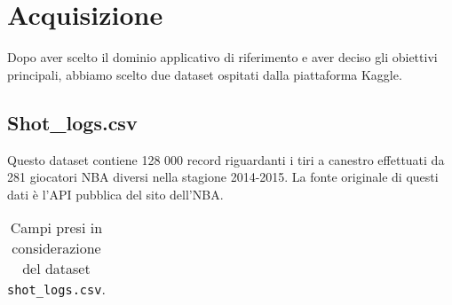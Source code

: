 \section{Acquisizione}

Dopo aver scelto il dominio applicativo di riferimento e aver deciso gli obiettivi principali, abbiamo scelto due dataset ospitati dalla piattaforma Kaggle.

\subsection{Shot\_logs.csv}

Questo dataset contiene 128 000 record riguardanti i tiri a canestro effettuati da 281 giocatori NBA diversi nella stagione 2014-2015. La fonte originale di questi dati è l’API pubblica del sito dell’NBA.
\begin{center}
	\begin{longtable}[m]{|m{8em} m{7em} m{16em}|} 

		\caption{Campi presi in considerazione del dataset \texttt{shot\_logs.csv}.\label{long}}\\


\end{longtable}
\end{center}
